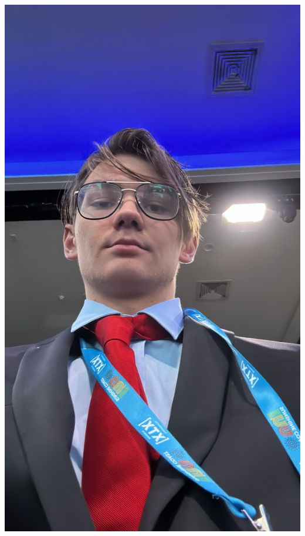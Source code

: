 \documentclass{article}
\begin{document}
\begin{center}
  \includegraphics[scale=0.13]{assets/suit.jpg}

\end{center}
\end{document}
